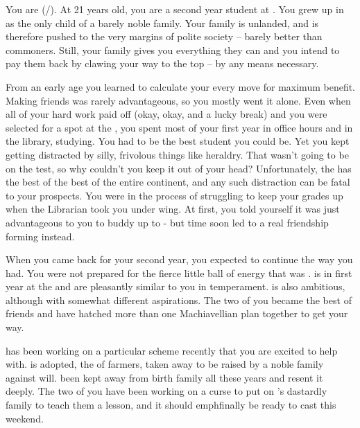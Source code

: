 \documentclass[char]{GL2020}
\begin{document}
\name{\cLibAssist{}}

You are \cLibAssist{} (\cLibAssist{\they}/\cLibAssist{\them}). At 21 years old, you are a second year student at \pSchool{}. You grew up in \pFarm{} as the only child of a barely noble family. Your family is unlanded, and is therefore pushed to the very margins of polite society -- barely better than commoners. Still, your family gives you everything they can and you intend to pay them back by clawing your way to the top -- by any means necessary.

From an early age you learned to calculate your every move for maximum benefit. Making friends was rarely advantageous, so you mostly went it alone. Even when all of your hard work paid off (okay, okay, and a lucky break) and you were selected for a spot at the \pSchool{}, you spent most of your first year in office hours and in the library, studying. You had to be the best student you could be. Yet you kept getting distracted by silly, frivolous things like heraldry. That wasn't going to be on the test, so why couldn't you keep it out of your head? Unfortunately, the \pSc{} has the best of the best of the entire continent, and any such distraction can be fatal to your prospects. You were in the process of struggling to keep your grades up when the Librarian took you under \cLibrarian{\their} wing. At first, you told yourself it was just advantageous to you to buddy up to \cLibrarian{\them} - but time soon led to a real friendship forming instead.

When you came back for your second year, you expected to continue the way you had. You were not prepared for the fierce little ball of energy that was \cAdopted{}. \cAdopted{} is in \cAdopted{\their} first year at the \pSc{} and \cAdopted{\they} are pleasantly similar to you in temperament. \cAdopted{} is also ambitious, although with somewhat different aspirations. The two of you became the best of friends and have hatched more than one Machiavellian plan together to get your way.

\cAdopted{} has been working on a particular scheme recently that you are excited to help with. \cAdopted{} is adopted, the \cAdopted{\child} of farmers, taken away to be raised by a noble family against \cAdopted{\their} will. \cAdopted{\They} \cAdopted{\have} been kept away from \cAdopted{\their} birth family all these years and \cAdopted{\they} resent\cAdopted{\plural} it deeply. The two of you have been working on a curse to put on \cAdopted{}'s dastardly family to teach them a lesson, and it should emph{finally} be ready to cast this weekend.
\end{document}
